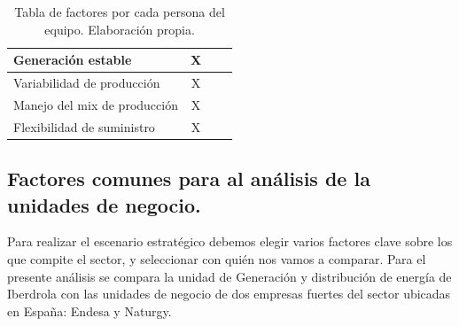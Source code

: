 \documentclass{article}
\begin{document}
\begin{table}[h]
\begin{tabular}{|p{5cm}|c|c|c|}
        Generación estable & X                  &                        &                          \\ \hline
        Variabilidad de producción & X          &                        &                          \\ \hline
        Manejo del mix de producción & X        &                        &                          \\ \hline
        Flexibilidad de suministro & X          &                        &                          \\ \hline
    \end{tabular}
    \caption{Tabla de factores por cada persona del equipo. Elaboración propia.}
    \label{tab:factores}
\end{table}

\subsection{Factores comunes para al análisis de la unidades de negocio.}

Para realizar el escenario estratégico debemos elegir varios factores clave sobre los que compite el sector, y seleccionar con quién nos vamos a comparar. 
Para el presente análisis se compara la unidad de Generación y distribución de energía de Iberdrola con las unidades de negocio de dos empresas fuertes del sector ubicadas en España: Endesa y Naturgy.
\end{document}
